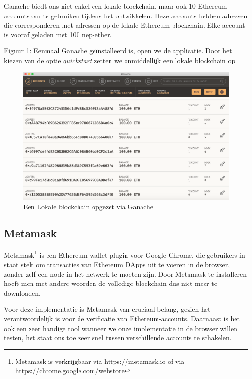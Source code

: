 	Ganache biedt ons  niet enkel een lokale blockchain, maar ook 10 Ethereum accounts om te gebruiken tijdens het ontwikkelen. Deze accounts hebben adressen die corresponderen met adressen op de lokale Ethereum-blockchain. Elke account is vooraf geladen met 100 nep-ether.
	
	Figuur \ref{fig:ganache-blockchain}: Eenmaal Ganache geïnstalleerd is, open we de applicatie. Door het kiezen van de optie \textit{quickstart} zetten we onmiddellijk een lokale blockchain op. 
	
	\begin{figure}
		\includegraphics[width=\linewidth]{img/ganache-blockchain.png}
		\caption{Een Lokale blockchain opgezet via Ganache}
		\label{fig:ganache-blockchain}
	\end{figure}
	
	
	\subsection{Metamask}
	Metamask\footnote{Metamask is verkrijgbaar via https://metamask.io of via https://chrome.google.com/webstore} is een Ethereum wallet-plugin voor Google Chrome, die gebruikers in staat stelt om transacties van Ethereum DApps uit te voeren in de browser, zonder zelf een node in het netwerk te moeten zijn. Door Metamask te installeren hoeft men met andere woorden de volledige blockchain dus niet meer te downloaden. 
	
	Voor deze implementatie is Metamask van cruciaal belang, gezien het verantwoordelijk is voor de verificatie van Ethereum-accounts. Daarnaast is het ook een zeer handige tool wanneer we onze implementatie in de browser willen testen, het staat ons toe zeer snel tussen verschillende accounts te schakelen.
	
